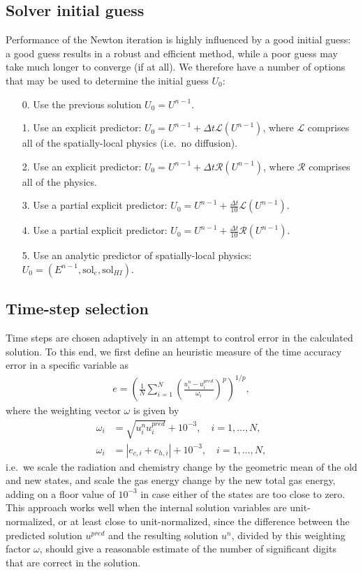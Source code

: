 \documentclass[letterpaper,10pt]{article}
\renewcommand{\(}{\left(}
\renewcommand{\)}{\right)}
\newcommand{\dt}{\Delta t}
\begin{document}
\subsection{Solver initial guess}
\label{sec:initial_guess}

Performance of the Newton iteration is highly influenced by a good
initial guess: a good guess results in a robust and efficient method,
while a poor guess may take much longer to converge (if at all).  We
therefore have a number of options that may be used to determine the
initial guess $U_0$:
\begin{itemize}
\item[0.] Use the previous solution 
  $U_0 = U^{n-1}$.
\item[1.] Use an explicit predictor: $U_0 = U^{n-1} + \dt
  \mathcal L(U^{n-1})$, where $\mathcal L$ comprises all of the
  spatially-local physics (i.e.~no diffusion).
\item[2.] Use an explicit predictor: $U_0 = U^{n-1} + \dt
  \mathcal R(U^{n-1})$, where $\mathcal R$ comprises all of the
  physics.
\item[3.] Use a partial explicit predictor: $U_0 = U^{n-1} + \frac{\dt}{10}
  \mathcal L(U^{n-1})$.
\item[4.] Use a partial explicit predictor: $U_0 = U^{n-1} + \frac{\dt}{10}
  \mathcal R(U^{n-1})$.
\item[5.] Use an analytic predictor of spatially-local physics: $U_0
  = (E^{n-1},\text{sol}_e,\text{sol}_{HI})$. 
\end{itemize}

\subsection{Time-step selection}
\label{sec:dt_selection}

Time steps are chosen adaptively in an attempt to control error in the
calculated solution.  To this end, we first define an heuristic
measure of the time accuracy error in a specific variable as
\begin{align}
\label{eq:time_error}
  e = \left(\frac1N \sum_{i=1}^N
    \left(\frac{u_i^{n}-u_i^{pred}}{\omega_i}\right)^p\right)^{1/p}, 
\end{align}
where the weighting vector $\omega$ is given by
\begin{align}
\label{eq:time_weighting}
  \omega_i &= \sqrt{u_i^n u_i^{pred}} + 10^{-3}, \quad i=1,\ldots,N, \\
  \omega_i &= |e_{c,i} + e_{h,i}| + 10^{-3}, \quad i=1,\ldots,N,
\end{align}
i.e.~we scale the radiation and chemistry change by the geometric mean
of the old and new states, and scale the gas energy change by the new
total gas energy, adding on a floor value of $10^{-3}$ in case either
of the states are too close to zero.  This approach works well when
the internal solution variables are unit-normalized, or at least close
to unit-normalized, since the difference between the predicted
solution $u^{pred}$ and the resulting solution $u^n$, divided by this
weighting factor $\omega$, should give a reasonable estimate of the
number of significant digits that are correct in the solution.
\end{document}
